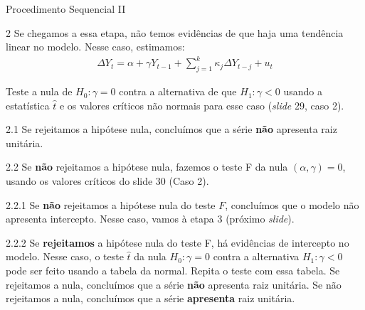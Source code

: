 \documentclass[11pt]{beamer}
\newenvironment{wideenumerate}{\enumerate\addtolength{\itemsep}{10pt}}{\endenumerate}
\newenvironment{halfwideenumerate}{\enumerate\addtolength{\itemsep}{0.5em}}{\endenumerate}
\begin{document}
\begin{frame}{Procedimento Sequencial II}
	\begin{wideenumerate}
		\item[2] Se chegamos a essa etapa, não temos evidências de que haja uma tendência linear no modelo. Nesse caso, estimamos:
		\begin{equation}
			\begin{aligned}
				\Delta Y_t = \alpha  + \gamma Y_{t-1}  +\sum_{j=1}^k \kappa_j \Delta Y_{t-j} + u_t
			\end{aligned}
		\end{equation}
		
		Teste a nula de $H_0: \gamma = 0$ contra a alternativa de que $H_1: \gamma < 0$ usando a estatística $\hat{t}$ e os valores críticos não normais para esse caso (\textit{slide} 29, caso 2).
		\begin{halfwideenumerate}
			\item[2.1] Se rejeitamos a hipótese nula, concluímos que a série \textbf{não} apresenta raiz unitária.
			\item[2.2] Se \textbf{não} rejeitamos a hipótese nula, fazemos o teste F da nula $(\alpha, \gamma)=0$, usando os valores críticos do slide 30 (Caso 2).
			\begin{halfwideenumerate}
				\item[2.2.1] Se \textbf{não} rejeitamos a hipótese  nula do teste $F$, concluímos que o modelo não apresenta intercepto. Nesse caso, vamos à etapa 3 (próximo \textit{slide}).
				\item[2.2.2] Se \textbf{rejeitamos} a hipótese nula do teste F, há evidências de intercepto no modelo. Nesse caso, o teste $\hat{t}$ da nula $H_0: \gamma = 0$ contra a alternativa  $H_1: \gamma < 0$ pode ser feito usando a tabela da normal. Repita o teste com essa tabela. Se rejeitamos a nula, concluímos que a série \textbf{não} apresenta raiz unitária. Se não rejeitamos a nula, concluímos que a série \textbf{apresenta} raiz unitária.
			\end{halfwideenumerate}
		\end{halfwideenumerate}
		
	\end{wideenumerate}
	
\end{frame}
\end{document}
